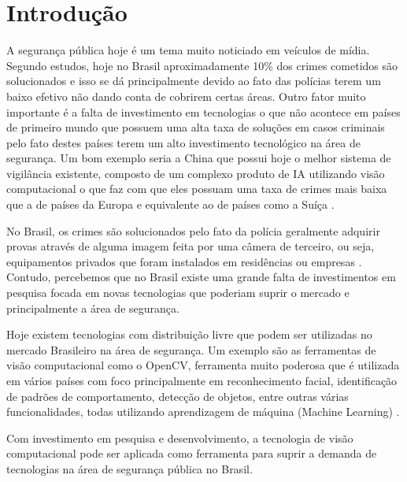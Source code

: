 \chapter{Introdução}\label{cap:introducao}




A segurança pública hoje é um tema muito noticiado em veículos de mídia. Segundo estudos, hoje no Brasil aproximadamente 10\% dos crimes cometidos são solucionados \cite{um} e isso se dá principalmente devido ao fato das polícias terem um baixo efetivo não dando conta de cobrirem certas áreas. Outro fator muito importante é a falta de investimento em tecnologias o que não acontece em países de primeiro mundo que possuem uma alta taxa de soluções em casos criminais pelo fato destes países terem um alto investimento tecnológico na área de segurança. Um bom exemplo seria a China que possui hoje o melhor sistema de vigilância existente, composto de um complexo produto de IA utilizando visão computacional o que faz com que eles possuam uma taxa de crimes mais baixa que a de países da Europa e equivalente ao de países como a Suíça \cite{dois}.  

No Brasil, os crimes são solucionados pelo fato da polícia geralmente adquirir provas através de alguma imagem feita por uma câmera de terceiro, ou seja, equipamentos privados que foram instalados em residências ou empresas \cite{dezesseis}. Contudo, percebemos que no Brasil existe uma grande falta de investimentos em pesquisa focada em novas tecnologias que poderiam suprir o mercado e principalmente a área de segurança. 

Hoje existem tecnologias com distribuição livre que podem ser utilizadas no mercado Brasileiro na área de segurança. Um exemplo são as ferramentas de visão computacional como o OpenCV, ferramenta muito poderosa que é utilizada em vários países com foco principalmente em reconhecimento facial, identificação de padrões de comportamento, detecção de objetos, entre outras várias funcionalidades, todas utilizando aprendizagem de máquina (Machine Learning) \cite{dezessete}.  

Com investimento em pesquisa e desenvolvimento, a tecnologia de visão computacional pode ser aplicada como ferramenta para suprir a demanda de tecnologias na área de segurança pública no Brasil.

